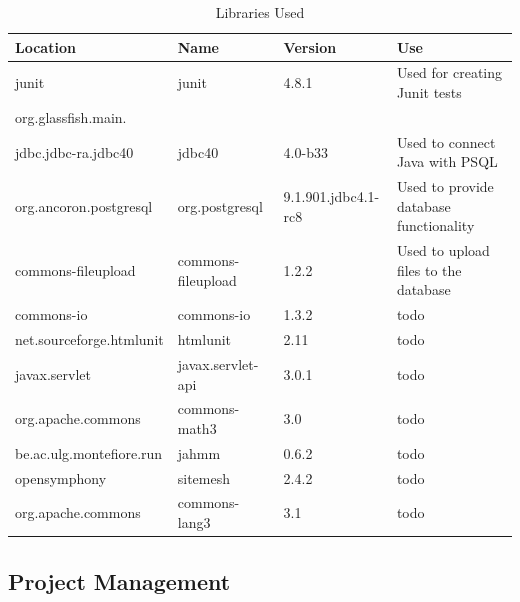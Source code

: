 \documentclass[11pt]{article}
\begin{document}
\begin{table}[htdp]
\caption{Libraries Used}
\begin{center}
\begin{tabular}{|p{4cm}|p{3cm}|p{3cm}|p{6cm}|}
Location & Name & Version & Use \\
\hline
junit                                   & junit               & 4.8.1               & Used for creating Junit tests \\
org.glassfish.main.\\jdbc.jdbc-ra.jdbc40  & jdbc40            & 4.0-b33             & Used to connect Java with PSQL \\
org.ancoron.postgresql                  & org.postgresql      & 9.1.901.jdbc4.1-rc8 & Used to provide database functionality \\
commons-fileupload                      & commons-fileupload  & 1.2.2               & Used to upload files to the database \\
commons-io                              & commons-io          & 1.3.2               & todo \\
net.sourceforge.htmlunit                & htmlunit            & 2.11                & todo \\
javax.servlet                           & javax.servlet-api   & 3.0.1               & todo \\
org.apache.commons                      & commons-math3       & 3.0                 & todo \\
be.ac.ulg.montefiore.run                & jahmm               & 0.6.2               & todo \\
opensymphony                            & sitemesh            & 2.4.2               & todo \\ 
org.apache.commons                      & commons-lang3       & 3.1                 & todo 

\end{tabular}
\end{center}
\label{libs}
\end{table}

\subsection{Project Management}
\end{document}
